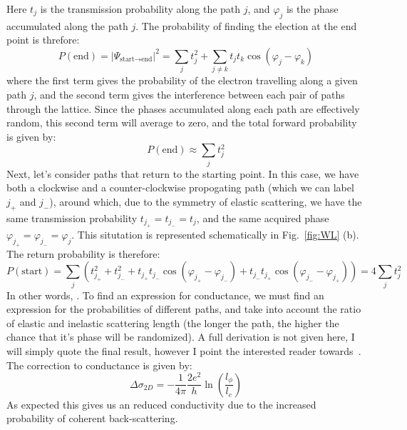 Here $t_j$ is the transmission probability along the path $j$, and $\varphi_j$ is the phase accumulated along the path $j$.
The probability of finding the election at the end point is threfore:
\begin{equation}
  P(\textrm{end}) = \left|\Psi_{\textrm{start}\rightarrow\textrm{end}}\right|^2 = \sum_j t_j^2 + \sum_{j \neq k} t_jt_k \cos(\varphi_j - \varphi_k)
\end{equation}
where the first term gives the probability of the electron travelling along a given path $j$, and the second term gives the
interference between each pair of paths through the lattice. Since the phases accumulated along each path are effectively random,
this second term will average to zero, and the total forward probability is given by:
\begin{equation}
P(\textrm{end}) \approx \sum_j t_j^2
\end{equation}
Next, let's consider paths that return to the starting point. In this case, we have both a clockwise and a counter-clockwise propogating
path (which we can label $j_+$ and $j_-$), around which, due to the symmetry of elastic scattering, we have the same transmission
probability $t_{j_+} = t_{j_-} = t_j$, and the same acquired phase $\varphi_{j_+} = \varphi_{j_-} = \varphi_j$. This situtation is represented schematically
in Fig.~\ref{fig:WL} (b). The return probability is therefore:
\begin{equation}
  P(\textrm{start}) = \sum_j \left(t_{j_+}^2 + t_{j_-}^2 + t_{j_+}t_{j_-}\cos(\varphi_{j_+} - \varphi_{j_-}) + t_{j_-}t_{j_+}\cos(\varphi_{j_-} - \varphi_{j_+})\right) = 4 \sum_jt_j^2
\end{equation}
In other words, . To find an expression for conductance, we must find an expression for the probabilities of different paths, and take
into account the ratio of elastic and inelastic scattering length (the longer the path, the higher the chance that it's phase will be randomized). A full derivation
is not given here, I will simply quote the final result, however I point the interested reader towards~\cite{delftbook,datta1997electronic}. The correction
to conductance is given by:
\begin{equation}
  \Delta \sigma_{2D} = -\frac{1}{4\pi}\frac{2e^2}{h}\ln\left(\frac{l_\phi}{l_e}\right)
\end{equation}
As expected this gives us an reduced conductivity due to the increased probability of coherent back-scattering.


